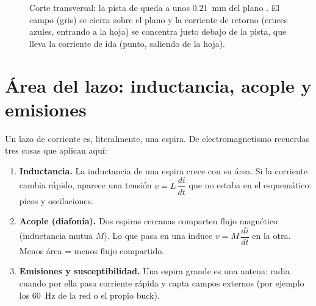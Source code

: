 \begin{figure}[htbp]
\centering
{}
\caption{Corte transversal: la pista de  queda a unos \SI{0.21}{\milli\meter} del plano .
El campo (gris) se cierra sobre el plano y la corriente de retorno (cruces azules, entrando a la hoja) se concentra
justo debajo de la pista, que lleva la corriente de ida (punto, saliendo de la hoja).}
\label{fig:c08-corte}
\end{figure}

\section{Área del lazo: inductancia, acople y emisiones}\label{sec:c08-area}

Un lazo de corriente es, literalmente, una espira. De electromagnetismo recuerdas tres cosas que aplican aquí:

\begin{enumerate}
  \item \textbf{Inductancia.} La inductancia de una espira crece con su área. Si la corriente cambia rápido, aparece
  una tensión $v = L\,\dfrac{di}{dt}$ que no estaba en el esquemático: picos y oscilaciones.
  \item \textbf{Acople (diafonía).} Dos espiras cercanas comparten flujo magnético (inductancia mutua $M$). Lo que pasa
  en una induce $v = M\,\dfrac{di}{dt}$ en la otra. Menos área = menos flujo compartido.
  \item \textbf{Emisiones y susceptibilidad.} Una espira grande es una antena: radia cuando por ella pasa corriente
  rápida y capta campos externos (por ejemplo los \SI{60}{\hertz} de la red o el propio buck).
\end{enumerate}

